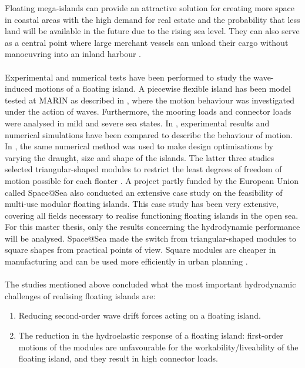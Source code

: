 

Floating mega-islands can provide an attractive solution for creating more space in coastal areas with the high demand for real estate and the probability that less land will be available in the future due to the rising sea level. They can also serve as a central point where large merchant vessels can unload their cargo without manoeuvring into an inland harbour \citep{businessCase_S@S_D1.1}.\\
\\
Experimental and numerical tests have been performed to study the wave-induced motions of a floating island. A piecewise flexible island has been model tested at MARIN as described in \citet{Waals2018}, where the motion behaviour was investigated under the action of waves. Furthermore, the mooring loads and connector loads were analysed in mild and severe sea states. In \citep{Otto2019}, experimental results and numerical simulations have been compared to describe the behaviour of motion. In \citep{Isope2019}, the same numerical method was used to make design optimisations by varying the draught, size and shape of the islands. The latter three studies selected triangular-shaped modules to restrict the least degrees of freedom of motion possible for each floater \citep{Waals2018}. A project partly funded by the European Union called Space@Sea also conducted an extensive case study on the feasibility of multi-use modular floating islands. This case study has been very extensive, covering all fields necessary to realise functioning floating islands in the open sea. For this master thesis, only the results concerning the hydrodynamic performance will be analysed. Space@Sea made the switch from triangular-shaped modules to square shapes from practical points of view. Square modules are cheaper in manufacturing and can be used more efficiently in urban planning \citep{S@SInventoryRegulations}.  \\
\\



The studies mentioned above concluded what the most important hydrodynamic challenges of realising floating islands are:
\begin{enumerate}
    \item Reducing second-order wave drift forces acting on a floating island.
    \item The reduction in the hydroelastic response of a floating island: first-order motions of the modules are unfavourable for the workability/liveability of the floating island, and they result in high connector loads. 
\end{enumerate}


